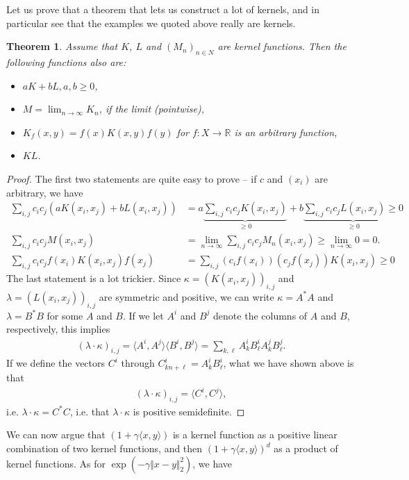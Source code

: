 \documentclass{article}
\newcommand{\sprod}[1]{\langle #1 \rangle}
\newcommand{\R}{\mathbb{R}}
\newtheorem{theorem}{Theorem}
\newcommand{\norm}[1]{\Vert #1 \Vert}
\begin{document}
Let us prove that a theorem that lets us construct a lot of kernels, and in particular see that the examples we quoted above really are kernels.
\begin{theorem}
    Assume that $K$, $L$ and $(M_n)_{n\in N}$ are kernel functions. Then the following functions also are:
    \begin{itemize}
        \item $aK + bL, a,b\geq 0$,
        \item $M=\lim_{n\to \infty}K_n$, if the limit (pointwise),
        \item $K_f(x,y)=f(x)K(x,y)f(y)$ for $f : X\to \R$ is an arbitrary function,
        \item $KL$.
    \end{itemize}
\end{theorem}
\begin{proof}
    The first two statements are quite easy to prove -- if $c$ and $(x_i)$ are arbitrary, we have
    \begin{align*}
        \sum_{i,j} c_ic_j (aK(x_i,x_j)+bL(x_i,x_j)) &=  a\underbrace{\sum_{i,j} c_ic_j K(x_i,x_j)}_{\geq 0}+b\underbrace{\sum_{i,j} c_ic_j L (x_i,x_j) \geq 0}_{\geq 0} \\
         \sum_{i,j} c_ic_j M(x_i,x_j) &= \lim_{n\to \infty }  \sum_{i,j} c_ic_j M_n(x_i,x_j) \geq \lim_{n\to \infty} 0 = 0. \\
         \sum_{i,j} c_ic_j f(x_i)K(x_i,x_j)f(x_j) &= \sum_{i,j}(c_if(x_i))(c_jf(x_j))K(x_i,x_j) \geq 0 
    \end{align*}
    The last statement is a lot trickier. Since $\kappa =(K(x_i,x_j))_{i,j}$ and $\lambda =(L(x_i,x_j))_{i,j}$ are symmetric and positive, we can write $\kappa = A^*A$ and $\lambda = B^*B$ for some $A$ and $B$. If we let $A^i$ and $B^j$ denote the columns of $A$ and $B$, respectively, this implies
    \begin{align*}
        (\lambda \cdot \kappa)_{i,j} = \sprod{A^i,A^j}\sprod{B^i,B^j} =  \sum_{k,\ell} A^i_kB^i_\ell A^j_kB^j_\ell.
    \end{align*}
    If we define the vectors $C^i$ through $C^i_{kn+\ell}=A^i_kB^i_\ell$, what we have shown above is that 
    \begin{align*}
        (\lambda \cdot \kappa)_{i,j} = \sprod{C^i,C^j},
    \end{align*}
    i.e. $\lambda \cdot \kappa = C^*C$, i.e. that $\lambda \cdot \kappa$ is positive semidefinite.
\end{proof}
We can now argue that $(1+\gamma\sprod{x,y})$ is a kernel function as a positive linear combination of two kernel functions, and then $(1+\gamma\sprod{x,y})^d$ as a product of kernel functions. As for $\exp(-\gamma \norm{x-y}_2^2)$, we have
\end{document}
